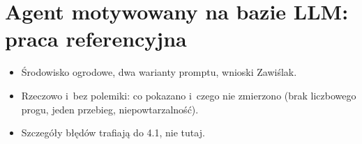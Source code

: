 \section{Agent motywowany na bazie LLM: praca referencyjna}
\label{sec:2-5}

\begin{planroboczy}[ok. 1,5 s.]
\begin{itemize}
  \item Środowisko ogrodowe, dwa warianty promptu, wnioski Zawiślak.
  \item Rzeczowo i~bez polemiki: co pokazano i~czego nie zmierzono (brak liczbowego progu, jeden przebieg, niepowtarzalność).
  \item Szczegóły błędów trafiają do 4.1, nie tutaj.
\end{itemize}

\end{planroboczy}

